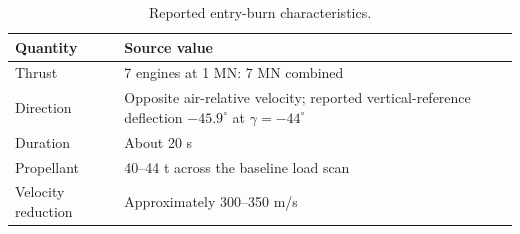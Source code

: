 \begin{table}[htbp]
\caption{Reported entry-burn characteristics.}
\label{tab:src7}
\small
\setlength{\tabcolsep}{3.5pt}
\begin{tabularx}{\linewidth}{@{}p{.22\linewidth}X@{}}
\toprule
Quantity & Source value \\
\midrule
Thrust & 7 engines at 1 MN: 7 MN combined \\
Direction & Opposite air-relative velocity; reported vertical-reference deflection $-45.9^\circ$ at $\gamma=-44^\circ$ \\
Duration & About 20 s \\
Propellant & 40--44 t across the baseline load scan \\
Velocity reduction & Approximately 300--350 m/s \\
\bottomrule
\end{tabularx}
\end{table}
